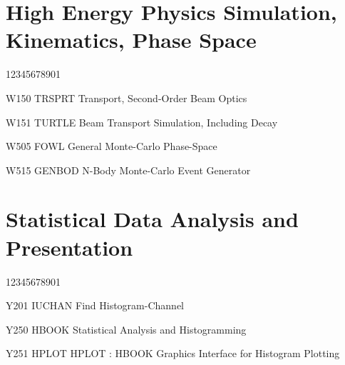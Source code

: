 \section*{High Energy Physics Simulation, Kinematics, Phase Space}
\begin{DLtt}{12345678901}
\item[W150 TRSPRT] Transport, Second-Order Beam Optics
\item[W151 TURTLE] Beam Transport Simulation, Including Decay
\item[W505 FOWL] General Monte-Carlo Phase-Space
\item[W515 GENBOD] N-Body Monte-Carlo Event Generator
\end{DLtt}
\section*{Statistical Data Analysis and Presentation}
\begin{DLtt}{12345678901}
\item[Y201 IUCHAN] Find Histogram-Channel
\item[Y250 HBOOK] Statistical Analysis and Histogramming
\item[Y251 HPLOT] HPLOT : HBOOK Graphics Interface for Histogram
Plotting
\end{DLtt}
